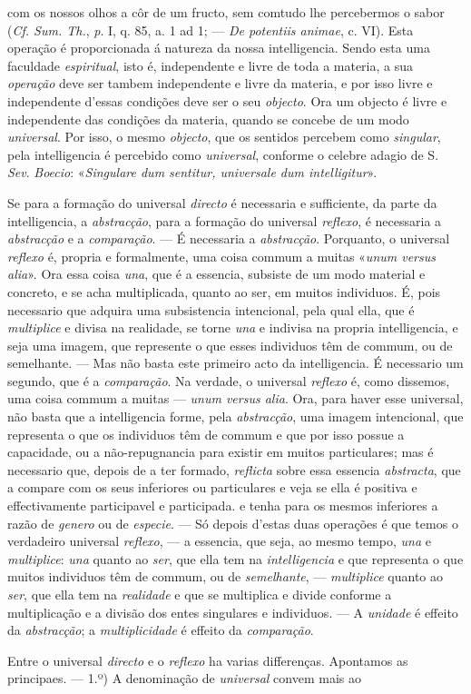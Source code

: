 com os nossos olhos a côr de um fructo, sem comtudo lhe percebermos o sabor (\emph{Cf. Sum. Th.}, \emph{p}. I, q. 85, a. 1 ad 1; --- \emph{De potentiis animae}, c. VI). Esta operação é proporcionada á natureza da nossa intelligencia. Sendo esta uma faculdade \emph{espiritual}, isto é, independente e livre de toda a materia, a sua \emph{operação} deve ser tambem independente e livre da materia, e por isso livre e independente d'essas condições deve ser o seu \emph{objecto}. Ora um objecto é livre e independente das condições da materia, quando se concebe de um modo \emph{universal}. Por isso, o mesmo \emph{objecto}, que os sentidos percebem como \emph{singular}, pela intelligencia é percebido como \emph{universal}, conforme o celebre adagio de S. \emph{Sev}. \emph{Boecio}: «\emph{Singulare dum sentitur, universale dum intelligitur}».\par Se para a formação do universal \emph{directo} é necessaria e sufficiente, da parte da intelligencia, a \emph{abstracção}, para a formação do universal \emph{reflexo}, é necessaria a \emph{abstracção} e a \emph{comparação}. --- É necessaria a \emph{abstracção}. Porquanto, o universal \emph{reflexo} é, propria e formalmente, uma coisa commum a muitas «\emph{unum versus alia}». Ora essa coisa \emph{una}, que é a essencia, subsiste de um modo material e concreto, e se acha multiplicada, quanto ao ser, em muitos individuos. É, pois necessario que adquira uma subsistencia intencional, pela qual ella, que é \emph{multiplice} e divisa na realidade, se torne \emph{una} e indivisa na propria intelligencia, e seja uma imagem, que represente o que esses individuos têm de commum, ou de semelhante. --- Mas não basta este primeiro acto da intelligencia. É necessario um segundo, que é a \emph{comparação}. Na verdade, o universal \emph{reflexo} é, como dissemos, uma coisa commum a muitas --- \emph{unum versus alia}. Ora, para haver esse universal, não basta que a intelligencia forme, pela \emph{abstracção}, uma imagem intencional, que representa o que os individuos têm de commum e que por isso possue a capacidade, ou a não-repugnancia para existir em muitos particulares; mas é necessario que, depois de a ter formado, \emph{reflicta} sobre essa essencia \emph{abstracta}, que a compare com os seus inferiores ou particulares e veja se ella é positiva e effectivamente participavel e participada. e tenha para os mesmos inferiores a razão de \emph{genero} ou de \emph{especie}. --- Só depois d'estas duas operações é que temos o verdadeiro universal \emph{reflexo}, --- a essencia, que seja, ao mesmo tempo, \emph{una} e \emph{multiplice}: \emph{una} quanto ao \emph{ser}, que ella tem na \emph{intelligencia} e que representa o que muitos individuos têm de commum, ou de \emph{semelhante}, --- \emph{multiplice} quanto ao \emph{ser}, que ella tem na \emph{realidade} e que se multiplica e divide conforme a multiplicação e a divisão dos entes singulares e individuos. --- A \emph{unidade} é effeito da \emph{abstracção}; a \emph{multiplicidade} é effeito da \emph{comparação}.\par Entre o universal \emph{directo} e o \emph{reflexo} ha varias differenças. Apontamos as principaes. --- 1.º) A denominação de \emph{universal} convem mais ao 